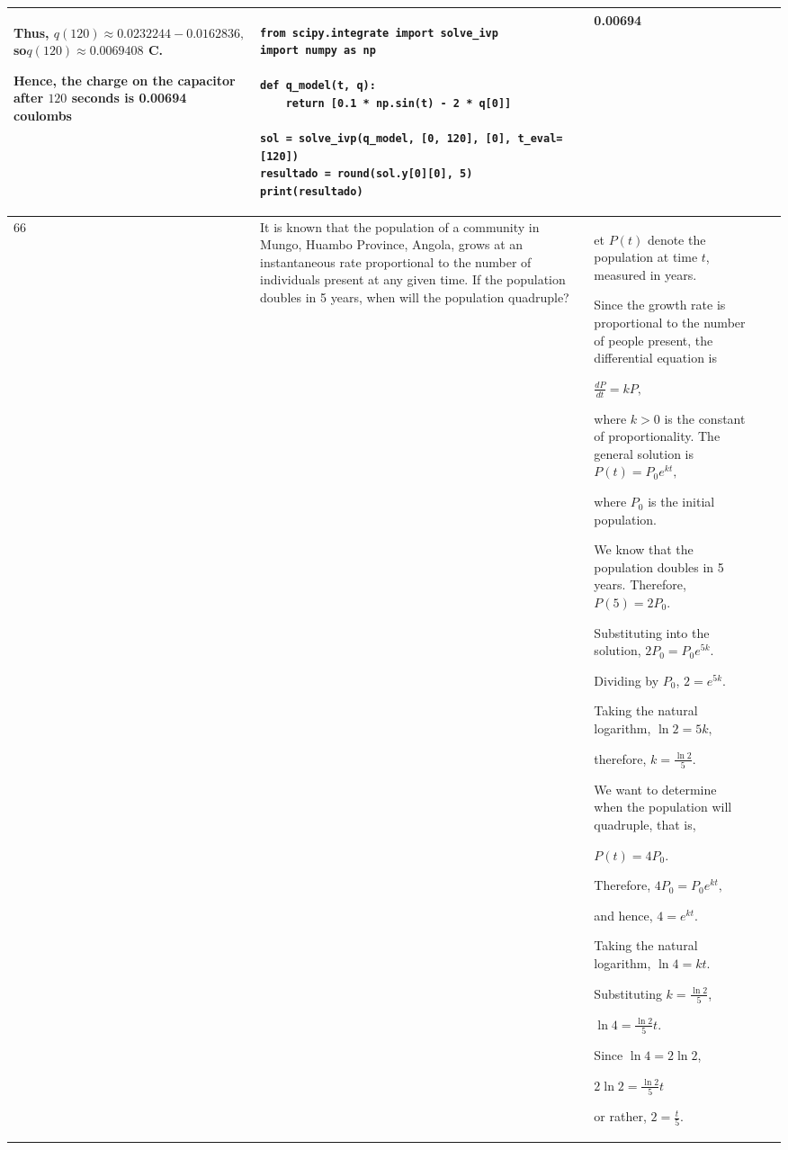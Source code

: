 \documentclass[a4paper,12pt]{article}
\begin{document}
\begin{longtable}{|p{0.3cm}|p{}|p{10cm}|p{}|p{1.5cm}|}
Thus, $q(120)\approx0.0232244-0.0162836,$
so$q(120)\approx0.0069408 $ C.

Hence, the charge on the capacitor after $120$ seconds is 0.00694 coulombs

&\begin{verbatim}
from scipy.integrate import solve_ivp
import numpy as np

def q_model(t, q):
    return [0.1 * np.sin(t) - 2 * q[0]]

sol = solve_ivp(q_model, [0, 120], [0], t_eval=[120])
resultado = round(sol.y[0][0], 5)
print(resultado)
\end{verbatim} &0.00694 \\ \hline 
 66           & It is known that the population of a community in Mungo, Huambo Province, Angola, grows at an instantaneous rate proportional to the number of individuals present at any given time. If the population doubles in 5 years, when will the population quadruple?&et $P(t)$ denote the population at time $t$, measured in years.

Since the growth rate is proportional to the number of people present, the differential equation is

$\frac{dP}{dt}=kP,$

where $k>0$ is the constant of proportionality. The general solution is $P(t)=P_0e^{kt},$

where $P_0$ is the initial population.

We know that the population doubles in 5 years. Therefore, $P(5)=2P_0.$

Substituting into the solution,
$2P_0=P_0e^{5k}.$

Dividing by $P_0$, $2=e^{5k}.$

Taking the natural logarithm, $\ln 2=5k,$

therefore, $k=\frac{\ln 2}{5}.$

We want to determine when the population will quadruple, that is,

$P(t)=4P_0.$

Therefore, $4P_0=P_0e^{kt},$

and hence, $4=e^{kt}.$

Taking the natural logarithm, $\ln4=kt.$

Substituting $k=\frac{\ln2}{5}$,

$\ln4=\frac{\ln2}{5}t.$

Since $\ln4=2\ln2$,

$2\ln2=\frac{\ln2}{5}t$

or rather, $2=\frac{t}{5}.$


\end{longtable}
\end{document}
